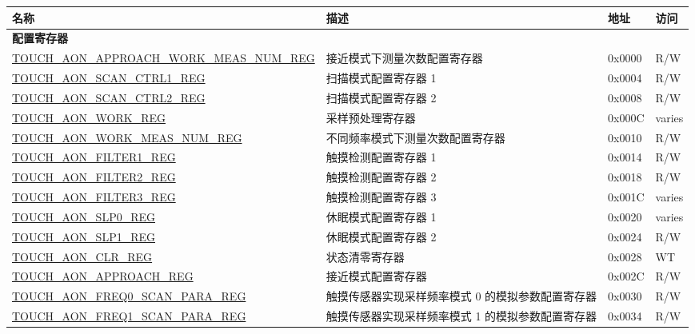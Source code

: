\begin{longtable}{ | p{8cm} | p{10cm} | p{1.3cm} | p{1cm} | }
\hline\rowcolor{lightgray}
\textbf{名称} & \textbf{描述} & \textbf{地址} & \textbf{访问} \\ \hline
\endhead
\multicolumn{4}{|l|}{\textbf{配置寄存器}} \\ \hline
\hyperref[regdesc:TOUCHAONAPPROACHWORKMEASNUMREG]{TOUCH\_AON\_APPROACH\_WORK\_MEAS\_NUM\_REG} & 接近模式下测量次数配置寄存器 & 0x0000 & R/W \\ \hline
\hyperref[regdesc:TOUCHAONSCANCTRL1REG]{TOUCH\_AON\_SCAN\_CTRL1\_REG} & 扫描模式配置寄存器 1 & 0x0004 & R/W \\ \hline
\hyperref[regdesc:TOUCHAONSCANCTRL2REG]{TOUCH\_AON\_SCAN\_CTRL2\_REG} & 扫描模式配置寄存器 2 & 0x0008 & R/W \\ \hline
\hyperref[regdesc:TOUCHAONWORKREG]{TOUCH\_AON\_WORK\_REG} & 采样预处理寄存器 & 0x000C & varies \\ \hline
\hyperref[regdesc:TOUCHAONWORKMEASNUMREG]{TOUCH\_AON\_WORK\_MEAS\_NUM\_REG} & 不同频率模式下测量次数配置寄存器 & 0x0010 & R/W \\ \hline
\hyperref[regdesc:TOUCHAONFILTER1REG]{TOUCH\_AON\_FILTER1\_REG} & 触摸检测配置寄存器 1 & 0x0014 & R/W \\ \hline
\hyperref[regdesc:TOUCHAONFILTER2REG]{TOUCH\_AON\_FILTER2\_REG} & 触摸检测配置寄存器 2 & 0x0018 & R/W \\ \hline
\hyperref[regdesc:TOUCHAONFILTER3REG]{TOUCH\_AON\_FILTER3\_REG} & 触摸检测配置寄存器 3 & 0x001C & varies \\ \hline
\hyperref[regdesc:TOUCHAONSLP0REG]{TOUCH\_AON\_SLP0\_REG} & 休眠模式配置寄存器 1 & 0x0020 & varies \\ \hline
\hyperref[regdesc:TOUCHAONSLP1REG]{TOUCH\_AON\_SLP1\_REG} & 休眠模式配置寄存器 2 & 0x0024 & R/W \\ \hline
\hyperref[regdesc:TOUCHAONCLRREG]{TOUCH\_AON\_CLR\_REG} & 状态清零寄存器 & 0x0028 & WT \\ \hline
\hyperref[regdesc:TOUCHAONAPPROACHREG]{TOUCH\_AON\_APPROACH\_REG} & 接近模式配置寄存器 & 0x002C & R/W \\ \hline
\hyperref[regdesc:TOUCHAONFREQ0SCANPARAREG]{TOUCH\_AON\_FREQ0\_SCAN\_PARA\_REG} & 触摸传感器实现采样频率模式 0 的模拟参数配置寄存器 & 0x0030 & R/W \\ \hline
\hyperref[regdesc:TOUCHAONFREQ1SCANPARAREG]{TOUCH\_AON\_FREQ1\_SCAN\_PARA\_REG} & 触摸传感器实现采样频率模式 1 的模拟参数配置寄存器 & 0x0034 & R/W \\ \hline

\end{longtable}
